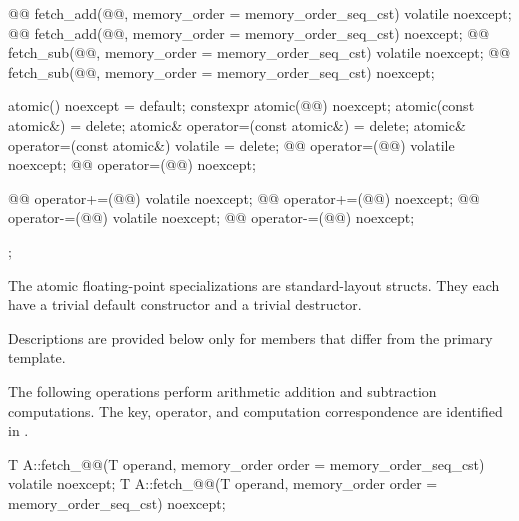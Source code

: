 \begin{codeblock}
{{    @@ fetch_add(@@,
                             memory_order = memory_order_seq_cst) volatile noexcept;
    @@ fetch_add(@@,
                             memory_order = memory_order_seq_cst) noexcept;
    @@ fetch_sub(@@,
                             memory_order = memory_order_seq_cst) volatile noexcept;
    @@ fetch_sub(@@,
                             memory_order = memory_order_seq_cst) noexcept;

    atomic() noexcept = default;
    constexpr atomic(@@) noexcept;
    atomic(const atomic&) = delete;
    atomic& operator=(const atomic&) = delete;
    atomic& operator=(const atomic&) volatile = delete;
    @@ operator=(@@) volatile noexcept;
    @@ operator=(@@) noexcept;

    @@ operator+=(@@) volatile noexcept;
    @@ operator+=(@@) noexcept;
    @@ operator-=(@@) volatile noexcept;
    @@ operator-=(@@) noexcept;
  };
}
\end{codeblock}

\pnum
The atomic floating-point specializations
are standard-layout structs.
They each have a trivial default constructor
and a trivial destructor.

\pnum
Descriptions are provided below only for members that differ from the primary template.

\pnum
The following operations perform arithmetic addition and subtraction computations.
The key, operator, and computation correspondence are identified in
.

%
%
%
%
%
%
\begin{itemdecl}
T A::fetch_@@(T operand, memory_order order = memory_order_seq_cst) volatile noexcept;
T A::fetch_@@(T operand, memory_order order = memory_order_seq_cst) noexcept;
\end{itemdecl}

